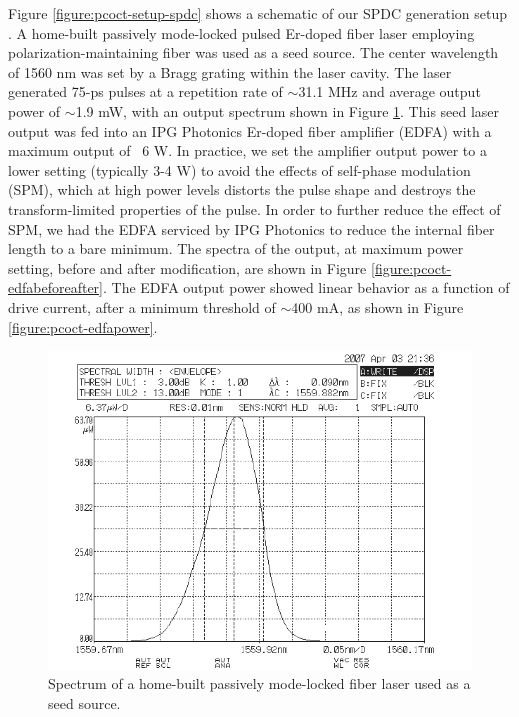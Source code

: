 Figure \ref{figure:pcoct-setup-spdc} shows a schematic of our SPDC generation setup \cite{legouet-experimental}. A home-built passively mode-locked pulsed Er-doped fiber laser employing polarization-maintaining fiber \cite{venkatraman-thesis} was used as a seed source. The center wavelength of 1560 nm was set by a Bragg grating within the laser cavity. The laser generated 75-ps pulses at a repetition rate of $\sim$31.1 MHz and average output power of $\sim$1.9 mW, with an output spectrum shown in Figure \ref{figure:pcoct-seedspectrum}. This seed laser output was fed into an IPG Photonics Er-doped fiber amplifier (EDFA) with a maximum output of ~6 W. In practice, we set the amplifier output power to a lower setting (typically 3-4 W) to avoid the effects of self-phase modulation (SPM), which at high power levels distorts the pulse shape and destroys the transform-limited properties of the pulse. In order to further reduce the effect of SPM, we had the EDFA serviced by IPG Photonics to reduce the internal fiber length to a bare minimum. The spectra of the output, at maximum power setting, before and after modification, are shown in Figure \ref{figure:pcoct-edfabeforeafter}. The EDFA output power showed linear behavior as a function of drive current, after a minimum threshold of $\sim$400 mA, as shown in Figure \ref{figure:pcoct-edfapower}.

\begin{figure}[h]
\begin{center}
\includegraphics[width=13cm]{figure-pcoct-seedspectrum.pdf}
\caption{Spectrum of a home-built passively mode-locked fiber laser \cite{venkatraman-thesis} used as a seed source.}
\label{figure:pcoct-seedspectrum}
\end{center}
\end{figure}


